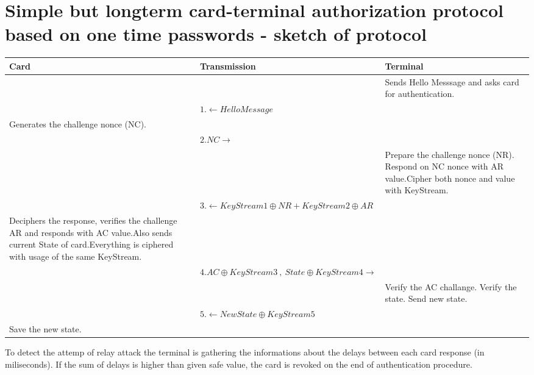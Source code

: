 \documentclass[10pt,titlepage]{article}
\begin{document}
\section*{Simple but longterm card-terminal authorization protocol based on one time passwords - sketch of protocol}

 \begin{table}[!ht]
 \centering
	\begin{tabular}{| p{4.55cm} |  p{4.55cm} | p{4.55cm}| }
 \hline
 Card & Transmission  & Terminal \\\hline
 & & Sends Hello Messsage and asks card for authentication.\\
 & $1. \leftarrow Hello Message$ & \\
 Generates the challenge nonce (NC). &  &  \\ 
 &   $2. NC \rightarrow $&  \\ 
 &  & Prepare the challenge nonce (NR). \newline Respond on NC nonce with AR value.\newline Cipher both nonce and value with KeyStream. \\ 
 & $3. \leftarrow KeyStream1 \oplus NR + KeyStream2 \oplus AR $&\\
 Deciphers the response, verifies the challenge AR and responds with AC value.\newline Also sends current State of card.\newline Everything is ciphered with usage of the same KeyStream. & & \\
 & $4. AC \oplus KeyStream3\: ,\: State \oplus KeyStream4 \rightarrow $& \\
 & & Verify the AC challange. \newline Verify the state. \newline Send new state.\\
 &$5. \leftarrow NewState \oplus KeyStream5$ &\\
 Save the new state. & &\\
 \hline

 \end{tabular}
 \end{table}
 
 To detect the attemp of relay attack the terminal is gathering the informations about the delays between each card response (in miliseconds).
 If the sum of delays is higher than given safe value, the card is revoked on the end of authentication procedure.
 
\end{document}
